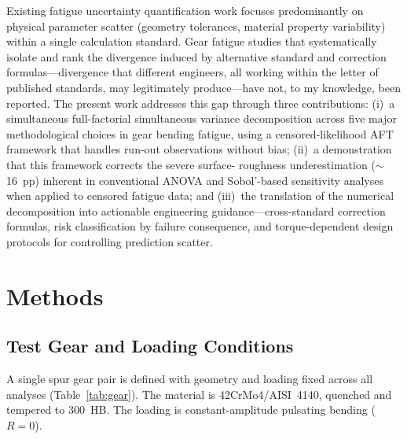 \documentclass[twocolumn,12pt,a4paper]{article}
\begin{document}
Existing fatigue uncertainty quantification work focuses predominantly
on physical parameter scatter (geometry tolerances, material property
variability) within a single calculation standard. Gear fatigue studies
that systematically isolate and rank the divergence induced by
alternative standard and correction formulas---divergence that different
engineers, all working within the letter of published standards, may
legitimately produce---have not, to my knowledge, been reported. The
present work addresses this gap through three contributions: (i)~a simultaneous
full-factorial
simultaneous variance decomposition across five major methodological
choices in gear bending fatigue, using a censored-likelihood AFT
framework that handles run-out observations without bias;
(ii)~a demonstration that this framework corrects the severe surface-
roughness underestimation ($\sim$16~pp) inherent in conventional
ANOVA and Sobol'-based sensitivity analyses when applied to censored
fatigue data; and (iii)~the translation of the numerical
decomposition into actionable engineering guidance---cross-standard
correction formulas, risk classification by failure consequence,
and torque-dependent design protocols for controlling prediction
scatter.

\section{Methods}
\label{sec:methods}

\subsection{Test Gear and Loading Conditions}

A single spur gear pair is defined with geometry and loading fixed
across all analyses (Table~\ref{tab:gear}). The material is
42CrMo4/AISI~4140, quenched and tempered to 300~HB. The loading is
constant-amplitude pulsating bending ($R=0$).
\end{document}
